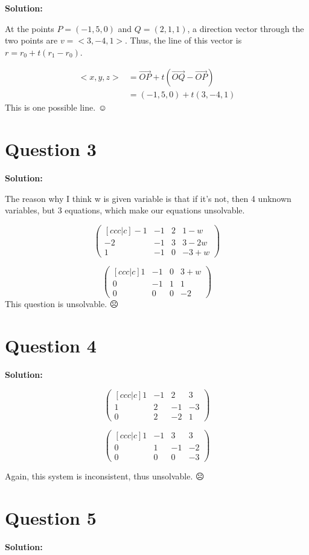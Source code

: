 \documentclass[11pt]{article} %
\begin{document}
\textbf{Solution:}


At the points $P=(-1,5,0)$ and $Q=(2,1,1)$, a direction vector through the two points are $v=<3,-4,1>$. Thus, the line of this vector is $r=r_0+t(r_1-r_0)$.

\begin{align*}
<x,y,z>&= \overrightarrow{OP}+t(\overrightarrow{OQ}-\overrightarrow{OP})\\
				&= (-1,5,0)+t(3,-4,1)
\end{align*}
This is one possible line. $\smiley$
	
\section{Question 3}

\textbf{Solution:}

The reason why I think w is given variable is that if it's not, then 4 unknown variables, but 3 equations, which make our equations unsolvable.

$$
\begin{pmatrix}[ccc|c]
	-1 &-1& 2&1-w\\
	-2 &-1 & 3&3-2w\\
	1&-1&0&-3+w
\end{pmatrix}
$$

$$
\begin{pmatrix}[ccc|c]
	1&-1&0&3+w\\
	0&-1&1&1\\
	0&0&0&-2
\end{pmatrix}
$$ 
This question is unsolvable. $\frownie{}$ 

\section{Question 4}
\textbf{Solution:}

$$\begin{pmatrix}[ccc|c]
	1&-1&2&3\\
	1&2&-1&-3\\
	0&2&-2&1
\end{pmatrix}
$$

$$\begin{pmatrix}[ccc|c]
	1&-1&3&3\\
	0&1&-1&-2\\
	0&0&0&-3
\end{pmatrix}
$$

Again, this system is inconsistent, thus unsolvable. $\frownie{}$

\section{Question 5}
\textbf{Solution:}
\end{document}
